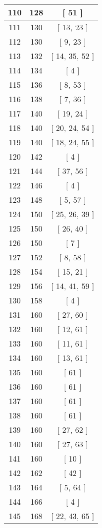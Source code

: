 \begin{center}
\begin{longtable}[H]{|| c c c ||}
\hline
110 & 128 & [ 51 ] \\ 
\hline
111 & 130 & [ 13, 23 ] \\ 
\hline
112 & 130 & [ 9, 23 ] \\ 
\hline
113 & 132 & [ 14, 35, 52 ] \\ 
\hline
114 & 134 & [ 4 ] \\ 
\hline
115 & 136 & [ 8, 53 ] \\ 
\hline
116 & 138 & [ 7, 36 ] \\ 
\hline
117 & 140 & [ 19, 24 ] \\ 
\hline
118 & 140 & [ 20, 24, 54 ] \\ 
\hline
119 & 140 & [ 18, 24, 55 ] \\ 
\hline
120 & 142 & [ 4 ] \\ 
\hline
121 & 144 & [ 37, 56 ] \\ 
\hline
122 & 146 & [ 4 ] \\ 
\hline
123 & 148 & [ 5, 57 ] \\ 
\hline
124 & 150 & [ 25, 26, 39 ] \\ 
\hline
125 & 150 & [ 26, 40 ] \\ 
\hline
126 & 150 & [ 7 ] \\ 
\hline
127 & 152 & [ 8, 58 ] \\ 
\hline
128 & 154 & [ 15, 21 ] \\ 
\hline
129 & 156 & [ 14, 41, 59 ] \\ 
\hline
130 & 158 & [ 4 ] \\ 
\hline
131 & 160 & [ 27, 60 ] \\ 
\hline
132 & 160 & [ 12, 61 ] \\ 
\hline
133 & 160 & [ 11, 61 ] \\ 
\hline
134 & 160 & [ 13, 61 ] \\ 
\hline
135 & 160 & [ 61 ] \\ 
\hline
136 & 160 & [ 61 ] \\ 
\hline
137 & 160 & [ 61 ] \\ 
\hline
138 & 160 & [ 61 ] \\ 
\hline
139 & 160 & [ 27, 62 ] \\ 
\hline
140 & 160 & [ 27, 63 ] \\ 
\hline
141 & 160 & [ 10 ] \\ 
\hline
142 & 162 & [ 42 ] \\ 
\hline
143 & 164 & [ 5, 64 ] \\ 
\hline
144 & 166 & [ 4 ] \\ 
\hline
145 & 168 & [ 22, 43, 65 ] \\ 

\end{longtable}
\end{center}
